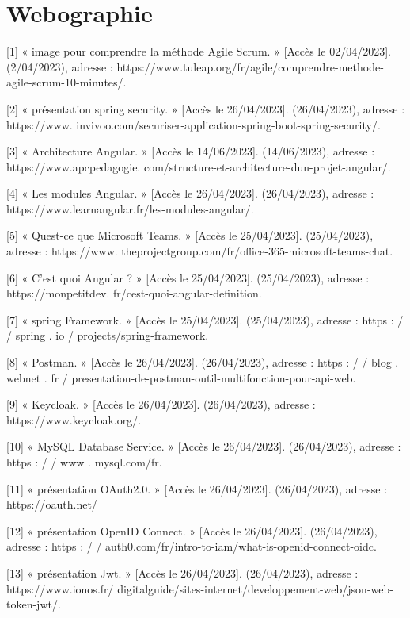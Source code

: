 
\chapter*{Webographie}

[1] « image pour comprendre la méthode Agile Scrum. » [Accès le 02/04/2023]. (2/04/2023), adresse : https://www.tuleap.org/fr/agile/comprendre-methode-agile-scrum-10-minutes/.

[2] « présentation spring security. » [Accès le 26/04/2023]. (26/04/2023), adresse : https://www.
invivoo.com/securiser-application-spring-boot-spring-security/.

[3] « Architecture Angular. » [Accès le 14/06/2023]. (14/06/2023), adresse : https://www.apcpedagogie.
com/structure-et-architecture-dun-projet-angular/.

[4] « Les modules Angular. » [Accès le 26/04/2023]. (26/04/2023), adresse : https://www.learnangular.fr/les-modules-angular/.

[5] « Quest-ce que Microsoft Teams. » [Accès le 25/04/2023]. (25/04/2023), adresse : https://www.
theprojectgroup.com/fr/office-365-microsoft-teams-chat.

[6] « C’est quoi Angular ? » [Accès le 25/04/2023]. (25/04/2023), adresse : https://monpetitdev.
fr/cest-quoi-angular-definition.

[7] « spring Framework. » [Accès le 25/04/2023]. (25/04/2023), adresse : https : / / spring . io /
projects/spring-framework.

[8] « Postman. » [Accès le 26/04/2023]. (26/04/2023), adresse : https : / / blog . webnet . fr /
presentation-de-postman-outil-multifonction-pour-api-web.

[9] « Keycloak. » [Accès le 26/04/2023]. (26/04/2023), adresse : https://www.keycloak.org/.

[10] « MySQL Database Service. » [Accès le 26/04/2023]. (26/04/2023), adresse : https : / / www .
mysql.com/fr.

[11] « présentation OAuth2.0. » [Accès le 26/04/2023]. (26/04/2023), adresse : https://oauth.net/

[12] « présentation OpenID Connect. » [Accès le 26/04/2023]. (26/04/2023), adresse : https : / /
auth0.com/fr/intro-to-iam/what-is-openid-connect-oidc.

[13] « présentation Jwt. » [Accès le 26/04/2023]. (26/04/2023), adresse : https://www.ionos.fr/
digitalguide/sites-internet/developpement-web/json-web-token-jwt/.